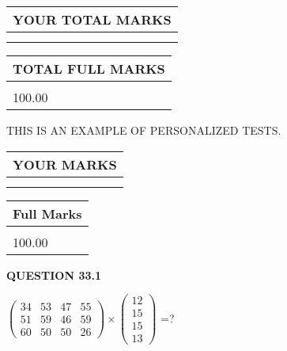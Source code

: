 \documentclass[12pt]{article}
\begin{document}
   
\vspace{0.2in}\noindent\begin{tabular}{|l|}
\hline
YOUR TOTAL MARKS  \\
\hline
 \\ 
 \\ 
\hline
\end{tabular}
\hspace{0.05in} \begin{tabular}{|l|}
\hline
TOTAL FULL MARKS  \\
\hline
 \\ 
100.00 \\
\hline
\end{tabular}
   
   
 \vspace{0.2in}
{\Huge  THIS IS AN EXAMPLE OF}
{\Huge  PERSONALIZED TESTS. }
   
   
  
\vspace{0.2in}
  
\noindent\begin{tabular}{|l|}
\hline
 YOUR MARKS  \\
\hline
 \\ 
 \\ 
\hline
\end{tabular}
\hspace{0.05in} \begin{tabular}{|l|}
\hline
 Full Marks  \\
\hline
 \\ 
100.00 \\
\hline
\end{tabular}
{\textbf{\Large{QUESTION
33.1 
}}}
  
  
 
$ \left( \begin{array}{ccccccccc}
 34  & 
 53  & 
 47  & 
 55  \\ 
 51  & 
 59  & 
 46  & 
 59  \\ 
 60  & 
 50  & 
 50  & 
 26
\end{array}\right) \times
\left( \begin{array}{c}
 12  \\ 
 15  \\ 
 15  \\ 
 13
\end{array}\right) $ =?
 
\end{document}
